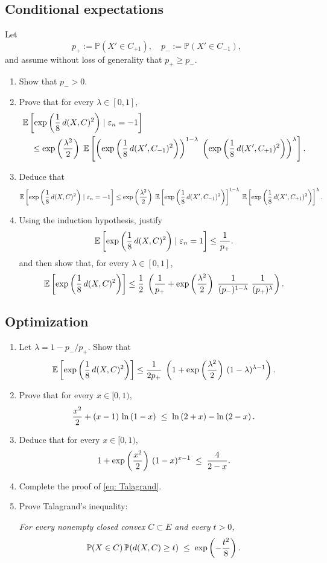 \documentclass[a4paper]{report}
\begin{document}
\subsection{Conditional expectations}
Let
\[
p_+ := \mathbb{P}(X'\in C_{+1}),\quad
p_- := \mathbb{P}(X'\in C_{-1}),
\]
and assume without loss of generality that \(p_+\geq p_-\).
\begin{enumerate}
\item Show that \(p_->0\).
\item Prove that for every \(\lambda\in[0,1]\),
  \[
  \begin{aligned}
    &\Ebb{\exp\lbrb{\frac18\,d(X,C)^2}\mid \varepsilon_n=-1}\\
    &\quad\le
    \exp\lbrb{\frac{\lambda^2}{2}}
    \;\Ebb{%
      \lbrb{\exp\lbrb{\frac18\,d(X',C_{-1})^2}}^{1-\lambda}
      \;\lbrb{\exp\lbrb{\frac18\,d(X',C_{+1})^2}}^{\lambda}
    }.
  \end{aligned}
  \]
\item Deduce that
  \[
    \mathbb {E}\left[ \exp\left ( \frac18\,d(X,C)^2 \right )\mid \varepsilon_n=-1\right]
    \le
    \exp\left ( \frac{\lambda^2}{2} \right )
    \;\mathbb {E}\left[ \exp\left ( \frac18\,d(X',C_{-1})^2 \right )\right]^{1-\lambda}
    \;\mathbb {E}\left[ \exp\left ( \frac18\,d(X',C_{+1})^2 \right )\right]^{\lambda}.
  \]
\item Using the induction hypothesis, justify
  \[
    \mathbb {E}\left[ \exp\left ( \frac18\,d(X,C)^2 \right )\mid \varepsilon_n=1\right]
    \le \frac{1}{p_+}.
  \]
and then show that, for every \(\lambda\in[0,1]\),
  \[
    \mathbb {E}\left[ \exp\left ( \frac18\,d(X,C)^2 \right )\right]
    \le
    \frac12\;\left ( 
      \frac1{p_+}
      + \exp\left ( \frac{\lambda^2}{2} \right )
        \;\frac1{(p_-)^{1-\lambda}}
        \;\frac1{(p_+)^{\lambda}}
     \right ).
  \]
\end{enumerate}

\subsection{Optimization}
\begin{enumerate}
\item Let \(\lambda=1-p_-/p_+\). Show that
  \[
    \mathbb {E}\left[ \exp\left ( \frac18\,d(X,C)^2 \right )\right]
    \le
    \frac{1}{2p_+}\;\left ( 
      1 + \exp\left ( \frac{\lambda^2}{2} \right )\,(1-\lambda)^{\lambda-1}
     \right ).
  \]
\item Prove that for every \(x\in[0,1)\),
  \[
    \frac{x^2}{2} + (x-1)\,\ln\left ( 1-x \right )
    \;\le\;
    \ln\left ( 2+x \right ) - \ln\left ( 2-x \right ).
  \]
\item Deduce that for every \(x\in[0,1)\),
  \[
    1 + \exp\left ( \frac{x^2}{2} \right )\,(1-x)^{x-1}
    \;\le\;
    \frac{4}{2-x}.
  \]
\item Complete the proof of \eqref{eq: Talagrand}.
\item Prove Talagrand's inequality:
    \begin{tcolorbox}[colframe=black, colback=white, boxrule=0.5mm, sharp corners]
\emph{For every nonempty closed convex \(C\subset E\) and every \(t>0\),
    \begin{equation}\label{eq:Talagrand2}
      \mathbb{P}(X\in C)\,\mathbb{P}(d(X,C)\ge t)
      \;\le\;
      \exp\left ( -\frac{t^2}{8} \right ).
    \end{equation}}
    \end{tcolorbox}
\end{enumerate}
\end{document}
